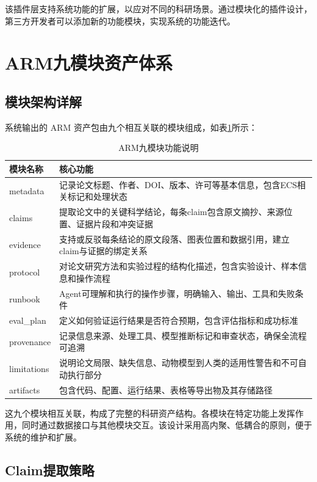 ﻿\documentclass[a4paper,12pt]{article}
\begin{document}
该插件层支持系统功能的扩展，以应对不同的科研场景。通过模块化的插件设计，第三方开发者可以添加新的功能模块，实现系统的功能迭代。

\section{ARM九模块资产体系}

\subsection{模块架构详解}

系统输出的 ARM 资产包由九个相互关联的模块组成，如表\ref{tab:arm_modules}所示：

\begin{table}[H]
\centering
\caption{ARM九模块功能说明}
\label{tab:arm_modules}
\begin{tabular}{p{3cm}p{10cm}}
\toprule
\textbf{模块名称} & \textbf{核心功能} \\
\midrule
metadata & 记录论文标题、作者、DOI、版本、许可等基本信息，包含ECS相关标记和处理状态 \\
claims & 提取论文中的关键科学结论，每条claim包含原文摘抄、来源位置、证据片段和冲突证据 \\
evidence & 支持或反驳每条结论的原文段落、图表位置和数据引用，建立claim与证据的绑定关系 \\
protocol & 对论文研究方法和实验过程的结构化描述，包含实验设计、样本信息和操作流程 \\
runbook & Agent可理解和执行的操作步骤，明确输入、输出、工具和失败条件 \\
eval\_plan & 定义如何验证运行结果是否符合预期，包含评估指标和成功标准 \\
provenance & 记录信息来源、处理工具、模型推断标记和审查状态，确保全流程可追溯 \\
limitations & 说明论文局限、缺失信息、动物模型到人类的适用性警告和不可自动执行部分 \\
artifacts & 包含代码、配置、运行结果、表格等导出物及其存储路径 \\
\bottomrule
\end{tabular}
\end{table}

这九个模块相互关联，构成了完整的科研资产结构。各模块在特定功能上发挥作用，同时通过数据接口与其他模块交互。该设计采用高内聚、低耦合的原则，便于系统的维护和扩展。

\subsection{Claim提取策略}
\end{document}

